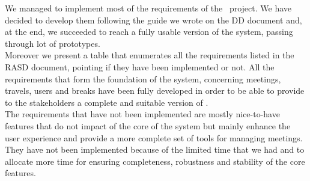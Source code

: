 We managed to implement most of the requirements of the \projectname~project. We have decided to develop them following the guide we wrote on the DD document and, at the end, we succeeded to reach a fully usable version of the system, passing through lot of prototypes. \\
Moreover we present a table that enumerates all the requirements listed in the RASD document, pointing if they have been implemented or not. All the requirements that form the foundation of the system, concerning meetings, travels, users and breaks have been fully developed in order to be able to provide to the stakeholders a complete and suitable version of \projectname. \\
The requirements that have not been implemented are mostly nice-to-have features that do not impact of the core of the system but mainly enhance the user experience and provide a more complete set of tools for managing meetings. They have not been implemented because of the limited time that we had and to allocate more time for ensuring completeness, robustness and stability of the core features.

\newcommand{\reqNum}{\stepcounter{countReq}\thecountReq}

